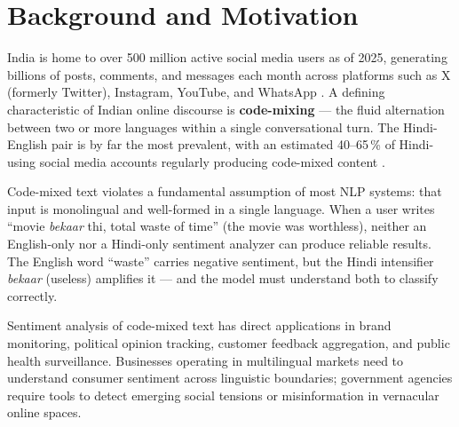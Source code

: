 \section{Background and Motivation}

India is home to over 500 million active social media users as of 2025, generating billions of posts, comments, and messages each month across platforms such as X (formerly Twitter), Instagram, YouTube, and WhatsApp \cite{statista2025}. A defining characteristic of Indian online discourse is \textbf{code-mixing} — the fluid alternation between two or more languages within a single conversational turn. The Hindi-English pair is by far the most prevalent, with an estimated 40--65\,\% of Hindi-using social media accounts regularly producing code-mixed content \cite{bali2014}.

Code-mixed text violates a fundamental assumption of most NLP systems: that input is monolingual and well-formed in a single language. When a user writes ``movie \emph{bekaar} thi, total waste of time'' (the movie was worthless), neither an English-only nor a Hindi-only sentiment analyzer can produce reliable results. The English word ``waste'' carries negative sentiment, but the Hindi intensifier \emph{bekaar} (useless) amplifies it — and the model must understand both to classify correctly.

Sentiment analysis of code-mixed text has direct applications in brand monitoring, political opinion tracking, customer feedback aggregation, and public health surveillance. Businesses operating in multilingual markets need to understand consumer sentiment across linguistic boundaries; government agencies require tools to detect emerging social tensions or misinformation in vernacular online spaces.
